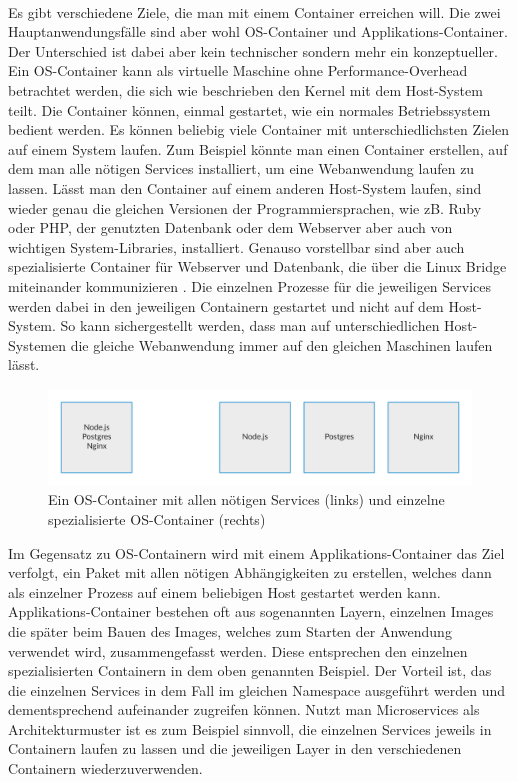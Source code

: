 \paragraph{}
Es gibt verschiedene Ziele, die man mit einem Container erreichen will. Die zwei Hauptanwendungsfälle sind aber wohl OS-Container und Applikations-Container. Der Unterschied ist dabei aber kein technischer sondern mehr ein konzeptueller.\\
Ein OS-Container kann als virtuelle Maschine ohne Performance-Overhead betrachtet werden, die sich wie beschrieben den Kernel mit dem Host-System teilt. Die Container können, einmal gestartet, wie ein normales Betriebssystem bedient werden. Es können beliebig viele Container mit unterschiedlichsten Zielen auf einem System laufen. Zum Beispiel könnte man einen Container erstellen, auf dem man alle nötigen Services installiert, um eine Webanwendung laufen zu lassen. Lässt man den Container auf einem anderen Host-System laufen, sind wieder genau die gleichen Versionen der Programmiersprachen, wie zB. Ruby oder PHP, der genutzten Datenbank oder dem Webserver aber auch von wichtigen System-Libraries, installiert. Genauso vorstellbar sind aber auch spezialisierte Container für Webserver und Datenbank, die über die Linux Bridge miteinander kommunizieren \cite{ocvsac}. Die einzelnen Prozesse für die jeweiligen Services werden dabei in den jeweiligen Containern gestartet und nicht auf dem Host-System. So kann sichergestellt werden, dass man auf unterschiedlichen Host-Systemen die gleiche Webanwendung immer auf den gleichen Maschinen laufen lässt.

\begin{figure}[!ht]
  \centering
  \includegraphics[width=1\textwidth]{images/4-os-specialized-containers.png}
  \caption{Ein OS-Container mit allen nötigen Services (links) und einzelne spezialisierte OS-Container (rechts)}
\end{figure}

Im Gegensatz zu OS-Containern wird mit einem Applikations-Container das Ziel verfolgt, ein Paket mit allen nötigen Abhängigkeiten zu erstellen, welches dann als einzelner Prozess auf einem beliebigen Host gestartet werden kann.
Applikations-Container bestehen oft aus sogenannten Layern, einzelnen Images die später beim Bauen des Images, welches zum Starten der Anwendung verwendet wird, zusammengefasst werden. Diese entsprechen den einzelnen spezialisierten Containern in dem oben genannten Beispiel. Der Vorteil ist, das die einzelnen Services in dem Fall im gleichen Namespace ausgeführt werden und dementsprechend aufeinander zugreifen können. Nutzt man Microservices als Architekturmuster ist es zum Beispiel sinnvoll, die einzelnen Services jeweils in Containern laufen zu lassen und die jeweiligen Layer in den verschiedenen Containern wiederzuverwenden.

